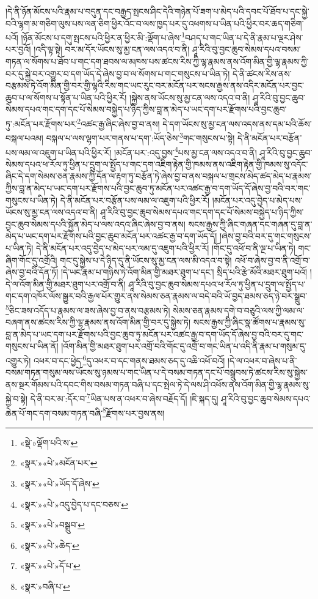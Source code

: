 །དེ་ནི་ཉོན་མོངས་པའི་རྣམ་པ་བདུན་དང་བརྒྱད་སྤངས་ཤིང་དེའི་གཉེན་པོ་ཟག་པ་མེད་པའི་དབང་པོ་ཐོབ་པ་དང་སྐྱེ་བའི་ལྷག་མ་གཅིག་ལུས་པས་ལན་ཅིག་ཕྱིར་འོང་བ་ལས་ཁྱད་པར་དུ་འཕགས་པ་ཡིན་པའི་ཕྱིར་བར་ཆད་གཅིག་པའོ། །ཉོན་མོངས་པ་དགུ་སྤངས་པའི་ཕྱིར་ན་ཕྱིར་མི་:ལྡོག་པ་ཞེས་\footnote{«སྡེ་»ལྡོག་པའི་ས་}བཤད་པ་གང་ཡིན་པ་དེ་ནི་རྣམ་པ་ལྔར་ཤེས་པར་བྱའོ། །འདི་ལྟ་སྟེ། བར་མ་དོར་ཡོངས་སུ་མྱ་ངན་ལས་འདའ་བ་ནི། ཤཱ་རིའི་བུ་བྱང་ཆུབ་སེམས་དཔའ་བསམ་གཏན་ལ་སོགས་པ་ཐོབ་པ་གང་དག་ཐབས་ལ་མཁས་པས་ཚངས་རིས་ཀྱི་ལྷ་རྣམས་ནས་འོག་མིན་གྱི་ལྷ་རྣམས་ཀྱི་བར་དུ་སྐྱེ་བར་འགྱུར་བ་དག་ཡོད་དེ་ཞེས་བྱ་བ་ལ་སོགས་པ་གང་གསུངས་པ་ཡིན་ཏེ། དེ་ནི་ཚངས་རིས་ནས་བརྩམས་ཏེ་འོག་མིན་གྱི་བར་གྱི་ལྷའི་རིས་གང་ཡང་རུང་བར་མངོན་པར་སངས་རྒྱས་ནས་འདིར་མངོན་པར་བྱང་ཆུབ་པ་ལ་སོགས་པ་སྟོན་པ་ཡིན་པའི་ཕྱིར་རོ། །སྐྱེས་ནས་ཡོངས་སུ་མྱ་ངན་ལས་འདའ་བ་ནི། ཤཱ་རིའི་བུ་བྱང་ཆུབ་སེམས་དཔའ་གང་དག་དང་པོ་སེམས་བསྐྱེད་པ་ཉིད་ཀྱིས་བླ་ན་མེད་པ་ཡང་དག་པར་རྫོགས་པའི་བྱང་ཆུབ་ཏུ་:མངོན་པར་རྫོགས་པར་\footnote{«སྣར་»«པེ་»མངོན་པར་}འཚང་རྒྱ་ཞིང་ཞེས་བྱ་བ་ནས། དེ་དག་ཡོངས་སུ་མྱ་ངན་ལས་འདས་ནས་དམ་པའི་ཆོས་བསྐལ་པའམ། བསྐལ་པ་ལས་ལྷག་པར་གནས་པ་དག་:ཡོད་ཅེས་\footnote{«སྣར་»«པེ་»ཡོད་དོ་ཞེས་}གང་གསུངས་པ་སྟེ། དེ་ནི་མངོན་པར་བརྩོན་པས་ལམ་ལ་འཇུག་པ་ཡིན་པའི་ཕྱིར་རོ། །མངོན་པར་:འདུ་བྱས་\footnote{«སྣར་»«པེ་»འདུ་བྱེད་པ་དང་བཅས་}པས་མྱ་ངན་ལས་འདའ་བ་ནི། ཤཱ་རིའི་བུ་བྱང་ཆུབ་སེམས་དཔའ་ཕ་རོལ་ཏུ་ཕྱིན་པ་དྲུག་ལ་སྤྱོད་པ་གང་དག་འཇིག་རྟེན་གྱི་ཁམས་ནས་འཇིག་རྟེན་གྱི་ཁམས་སུ་འདོང་ཞིང་དེ་དག་སེམས་ཅན་རྣམས་ཀྱི་དོན་ལ་རྟག་ཏུ་བརྩོན་ཏེ་ཞེས་བྱ་བ་ནས་བསྐལ་པ་གྲངས་མེད་ཚད་མེད་པ་རྣམས་ཀྱིས་བླ་ན་མེད་པ་ཡང་དག་པར་རྫོགས་པའི་བྱང་ཆུབ་ཏུ་མངོན་པར་འཚང་རྒྱ་བ་དག་ཡོད་དོ་ཞེས་བྱ་བའི་བར་གང་གསུངས་པ་ཡིན་ཏེ། དེ་ནི་མངོན་པར་བརྩོན་པས་ལམ་ལ་འཇུག་པའི་ཕྱིར་རོ། །མངོན་པར་འདུ་བྱེད་པ་མེད་པས་ཡོངས་སུ་མྱ་ངན་ལས་འདའ་བ་ནི། ཤཱ་རིའི་བུ་བྱང་ཆུབ་སེམས་དཔའ་གང་དག་དང་པོ་སེམས་བསྐྱེད་པ་ཉིད་ཀྱིས་བྱང་ཆུབ་སེམས་དཔའི་སྐྱོན་མེད་པ་ལས་འདའ་ཞིང་ཞེས་བྱ་བ་ནས། སངས་རྒྱས་ཀྱི་ཞིང་གཞན་དང་གཞན་དུ་བླ་ན་མེད་པ་ཡང་དག་པར་རྫོགས་པའི་བྱང་ཆུབ་མངོན་པར་འཚང་རྒྱ་བ་དག་ཡོད་དོ། །ཞེས་བྱ་བའི་བར་དུ་གང་གསུངས་པ་ཡིན་ཏེ། དེ་ནི་མངོན་པར་འདུ་བྱེད་པ་མེད་པར་ལམ་དུ་འཇུག་པའི་ཕྱིར་རོ། །གོང་དུ་འཕོ་བ་ནི་ལྔ་པ་ཡིན་ཏེ། གང་ཞིག་གོང་དུ་འགྲོའི། གང་དུ་སྐྱེས་པ་དེ་ཉིད་དུ་ནི་ཡོངས་སུ་མྱ་ངན་ལས་མི་འདའ་བ་སྟེ། འཕོ་བ་ཞེས་བྱ་བ་ནི་འགྲོ་བ་ཞེས་བྱ་བའི་དོན་ཏོ། །དེ་ཡང་རྣམ་པ་གཉིས་ཏེ་འོག་མིན་གྱི་མཐར་ཐུག་པ་དང་། སྲིད་པའི་རྩེ་མོའི་མཐར་ཐུག་པའོ། །དེ་ལ་འོག་མིན་གྱི་མཐར་ཐུག་པར་འགྲོ་བ་ནི། ཤཱ་རིའི་བུ་བྱང་ཆུབ་སེམས་དཔའ་ཕ་རོལ་ཏུ་ཕྱིན་པ་དྲུག་ལ་སྤྱོད་པ་གང་དག་འཁོར་ལོས་སྒྱུར་བའི་རྒྱལ་པོར་གྱུར་ནས་སེམས་ཅན་རྣམས་ལ་བདེ་བའི་ཡོ་བྱད་ཐམས་ཅད་ཉེ་བར་སྒྲུབ་\footnote{«སྣར་»«པེ་»བསྒྲུབ་}ཅིང་ཟས་འདོད་པ་རྣམས་ལ་ཟས་ཞེས་བྱ་བ་ནས་བརྩམས་ཏེ། སེམས་ཅན་རྣམས་དགེ་བ་བཅུའི་ལས་ཀྱི་ལམ་ལ་བཞག་ནས་ཚངས་རིས་ཀྱི་ལྷ་རྣམས་ནས་འོག་མིན་གྱི་བར་དུ་སྐྱེས་ཏེ། སངས་རྒྱས་ཀྱི་ཞིང་སྣ་ཚོགས་པ་རྣམས་སུ་བླ་ན་མེད་པ་ཡང་དག་པར་རྫོགས་པའི་བྱང་ཆུབ་ཏུ་མངོན་པར་འཚང་རྒྱ་བ་དག་ཡོད་དོ་ཞེས་བྱ་བའི་བར་དུ་གང་གསུངས་པ་ཡིན་ནོ། །འོག་མིན་གྱི་མཐར་ཐུག་པར་འགྲོ་བའི་གོང་དུ་འགྲོ་བ་གང་ཡིན་པ་འདི་ནི་རྣམ་པ་གསུམ་དུ་འགྱུར་ཏེ། འཕར་བ་དང་ཕྱེད་\footnote{«སྣར་»«པེ་»ཆེད་}དུ་འཕར་བ་དང་གནས་ཐམས་ཅད་དུ་འཆི་འཕོ་བའོ། །དེ་ལ་འཕར་བ་ཞེས་པ་ནི་བསམ་གཏན་གསུམ་ལས་ཡོངས་སུ་ཉམས་པ་གང་ཡིན་པ་དེ་བསམ་གཏན་དང་པོ་བསྒྲུབས་ཏེ་ཚངས་རིས་སུ་སྐྱེས་ནས་སྔར་གོམས་པའི་དབང་གིས་བསམ་གཏན་བཞི་པ་དང་སྤེལ་ཏེ་དེ་ལས་ཤི་འཕོས་ནས་འོག་མིན་གྱི་ལྷ་རྣམས་སུ་སྐྱེ་བ་སྟེ། དེ་ནི་བར་མ་:དོར་བ་\footnote{«སྣར་»«པེ་»དོ་པ་}ཡིན་པས་ན་འཕར་བ་ཞེས་བརྗོད་དོ། །ཇི་སྐད་དུ། ཤཱ་རིའི་བུ་བྱང་ཆུབ་སེམས་དཔའ་ཆེན་པོ་གང་དག་བསམ་གཏན་བཞི་\footnote{«སྣར་»བཞི་པ་}རྫོགས་པར་བྱས་ནས། 